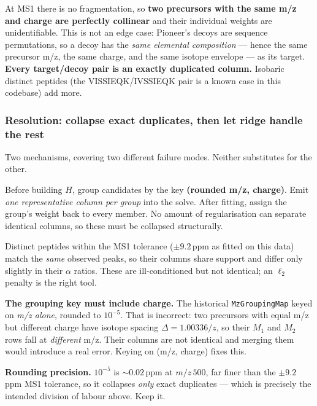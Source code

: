 \documentclass[11pt]{article}
\newcommand{\code}[1]{\texttt{\small #1}}
\begin{document}
At MS1 there is no fragmentation, so \textbf{two precursors with the same m/z and charge are
perfectly collinear} and their individual weights are unidentifiable. This is not an edge case:
Pioneer's decoys are sequence permutations, so a decoy has the \emph{same elemental
composition} --- hence the same precursor m/z, the same charge, and the same isotope envelope ---
as its target. \textbf{Every target/decoy pair is an exactly duplicated column.} Isobaric
distinct peptides (the VISSIEQK/IVSSIEQK pair is a known case in this codebase) add more.

\subsubsection*{Resolution: collapse exact duplicates, then let ridge handle the rest}

Two mechanisms, covering two different failure modes. Neither substitutes for the other.

\begin{description}[nosep]
  \item[Exact grouping $\rightarrow$ exactly-collinear columns.] Before building $H$, group
        candidates by the key \textbf{(rounded m/z, charge)}. Emit \emph{one representative
        column per group} into the solve. After fitting, assign the group's weight back to every
        member. No amount of regularisation can separate identical columns, so these must be
        collapsed structurally.
  \item[Light ridge $\rightarrow$ \emph{near}-collinear columns.] Distinct peptides within the
        MS1 tolerance ($\pm9.2$\,ppm as fitted on this data) match the \emph{same} observed peaks,
        so their columns share support and differ only slightly in their $\alpha$ ratios. These
        are ill-conditioned but not identical; an $\ell_2$ penalty is the right tool.
\end{description}

\noindent\textbf{The grouping key must include charge.} The historical \code{MzGroupingMap}
keyed on \emph{m/z alone}, rounded to $10^{-5}$. That is incorrect: two precursors with equal
m/z but different charge have isotope spacing $\Delta = 1.00336/z$, so their $M_1$ and $M_2$
rows fall at \emph{different} m/z. Their columns are not identical and merging them would
introduce a real error. Keying on (m/z, charge) fixes this.

\noindent\textbf{Rounding precision.} $10^{-5}$ is $\sim0.02$\,ppm at $m/z\,500$, far finer than
the $\pm9.2$\,ppm MS1 tolerance, so it collapses \emph{only} exact duplicates --- which is
precisely the intended division of labour above. Keep it.
\end{document}
